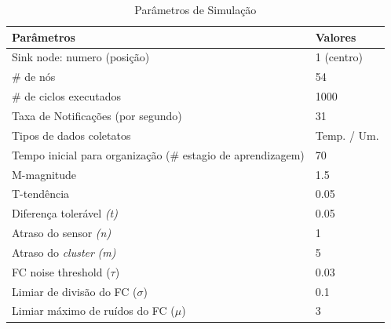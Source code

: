 \documentclass{acm_proc_article-sp}
\begin{document}
\begin{table}[h!]
\tiny 
\caption{Parâmetros de Simulação}
\label{tab:parameters}
\begin{center}
\begin{tabular}{|l||l|}
\hline
Parâmetros &Valores\\
\hline\hline
Sink node: numero (posição) &1 (centro) \\
\hline
\# de nós &54 \\
\hline
\# de ciclos executados &1000 \\
\hline
Taxa de Notificações (por segundo) &31 \\
\hline
Tipos de dados coletatos &Temp. / Um. \\
\hline
Tempo inicial para organização (\# estagio de aprendizagem) &70 \\
\hline
M-magnitude &1.5 \\
\hline
T-tendência &0.05 \\
\hline
Diferença tolerável {\it(t)} &0.05 \\
\hline
Atraso do sensor {\it(n)} &1 \\
\hline
Atraso do {\it cluster} {\it(m)} &5 \\
\hline
FC noise threshold ($\tau$) &0.03 \\
\hline
Limiar de divisão do FC ($\sigma$) &0.1 \\
\hline
Limiar máximo de ruídos do FC ($\mu$) &3 \\
\hline
\end{tabular}
\end{center}
\end{table}
\vspace*{-.3cm}
\end{document}
